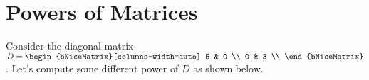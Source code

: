 
\section{Powers of Matrices}
\label{sec:powers_of_matrices}

Consider the diagonal matrix $D =
\begin{bNiceMatrix}[columns-width=auto]
  5 & 0 \\
  0 & 3 \\
\end{bNiceMatrix}$. Let's compute some different power of $D$ as shown below.

\begin{enumerate}
  \label{enum:powers_of_matrices}


\end{enumerate}
